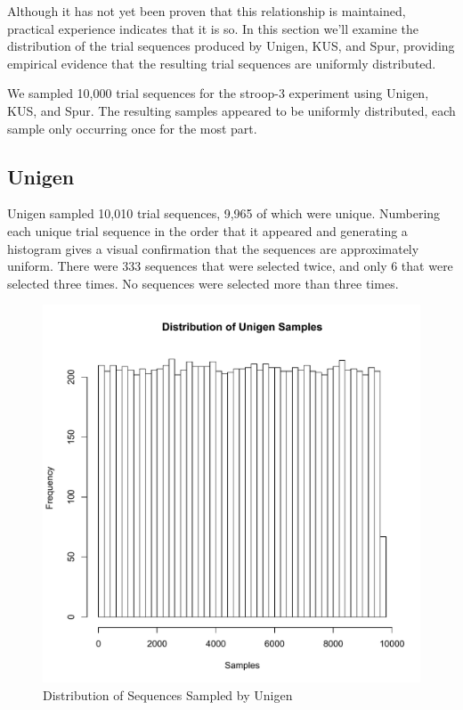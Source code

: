 Although it has not yet been proven that this relationship is maintained, practical experience indicates that it is so. In this section we'll examine the distribution of the trial sequences produced by Unigen, KUS, and Spur, providing empirical evidence that the resulting trial sequences are uniformly distributed.

We sampled 10,000 trial sequences for the stroop-3 experiment using Unigen, KUS, and Spur. The resulting samples appeared to be uniformly distributed, each sample only occurring once for the most part.


\subsection{Unigen}

Unigen sampled 10,010 trial sequences, 9,965 of which were unique. Numbering each unique trial sequence in the order that it appeared and generating a histogram gives a visual confirmation that the sequences are approximately uniform. There were 333 sequences that were selected twice, and only 6 that were selected three times. No sequences were selected more than three times.

\begin{figure}
\centering
\centerline{\includegraphics[origin=c,width=12cm]{../figures/unigen-samples.pdf}}
\caption{Distribution of Sequences Sampled by Unigen}
\label{fig:unigen_samples}
\end{figure}


